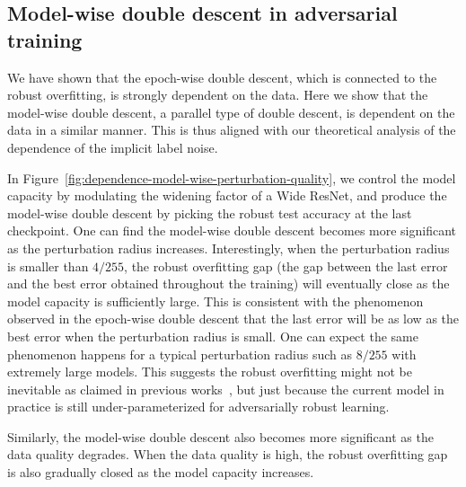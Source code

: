 
\subsection{Model-wise double descent in adversarial training}
\label{sect:model-wise-double-descent}

We have shown that the epoch-wise double descent, which is connected to the robust overfitting, is strongly dependent on the data. Here we show that the model-wise double descent, a parallel type of double descent, is dependent on the data in a similar manner. This is thus aligned with our theoretical analysis of the dependence of the implicit label noise.

In Figure~\ref{fig:dependence-model-wise-perturbation-quality}, we control the model capacity by modulating the widening factor of a Wide ResNet, and produce the model-wise double descent by picking the robust test accuracy at the last checkpoint. One can find the model-wise double descent becomes more significant as the perturbation radius increases. Interestingly, when the perturbation radius is smaller than $4/255$, the robust overfitting gap (the gap between the last error and the best error obtained throughout the training) will eventually close as the model capacity is sufficiently large. This is consistent with the phenomenon observed in the epoch-wise double descent that the last error will be as low as the best error when the perturbation radius is small. 
One can expect the same phenomenon happens for a typical perturbation radius such as $8/255$ with extremely large models. This suggests the robust overfitting might not be inevitable as claimed in previous works~\citep{Rice2020OverfittingIA}, but just because the current model in practice is still under-parameterized for adversarially robust learning. 

Similarly, the model-wise double descent also becomes more significant as the data quality degrades. When the data quality is high, the robust overfitting gap is also gradually closed as the model capacity increases. %


